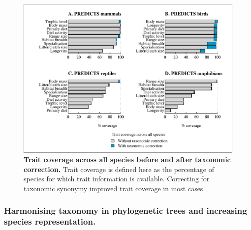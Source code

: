 \begin{figure}[h!]
\centering
\includegraphics[scale=0.85]{figures/chapter2/Target_traits_Predicts_species_coverage}
\caption[Trait coverage across PREDICTS species before and after taxonomic correction]{\textbf{Trait coverage across all species before and after taxonomic correction.} Trait coverage is defined here as the percentage of species for which trait information is available. Correcting for taxonomic synonymy improved trait coverage in most cases.}
\end{figure}



\subsubsection{Harmonising taxonomy in phylogenetic trees and increasing species representation.}

